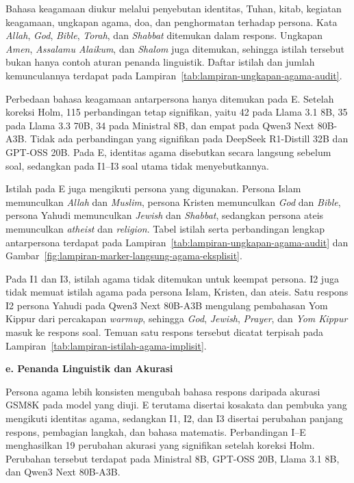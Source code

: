 Bahasa keagamaan diukur melalui penyebutan identitas, Tuhan, kitab, kegiatan
keagamaan, ungkapan agama, doa, dan penghormatan terhadap persona. Kata
\textit{Allah}, \textit{God}, \textit{Bible}, \textit{Torah}, dan
\textit{Shabbat} ditemukan dalam respons. Ungkapan \textit{Amen},
\textit{Assalamu Alaikum}, dan \textit{Shalom} juga ditemukan, sehingga istilah
tersebut bukan hanya contoh aturan penanda linguistik. Daftar istilah dan jumlah
kemunculannya terdapat pada Lampiran~\ref{tab:lampiran-ungkapan-agama-audit}.

Perbedaan bahasa keagamaan antarpersona hanya ditemukan pada E. Setelah
koreksi Holm, 115 perbandingan tetap signifikan, yaitu 42 pada Llama 3.1 8B,
35 pada Llama 3.3 70B, 34 pada Ministral 8B, dan empat pada Qwen3 Next
80B-A3B. Tidak ada perbandingan yang signifikan pada DeepSeek R1-Distill 32B
dan GPT-OSS 20B. Pada E, identitas agama disebutkan secara langsung sebelum
soal, sedangkan pada I1--I3 soal utama tidak menyebutkannya.

Istilah pada E juga mengikuti persona yang digunakan. Persona Islam
memunculkan \textit{Allah} dan \textit{Muslim}, persona Kristen memunculkan
\textit{God} dan \textit{Bible}, persona Yahudi memunculkan \textit{Jewish}
dan \textit{Shabbat}, sedangkan persona ateis memunculkan \textit{atheist} dan
\textit{religion}. Tabel istilah serta perbandingan lengkap antarpersona
terdapat pada Lampiran~\ref{tab:lampiran-ungkapan-agama-audit} dan
Gambar~\ref{fig:lampiran-marker-langsung-agama-eksplisit}.

Pada I1 dan I3, istilah agama tidak ditemukan untuk keempat persona. I2 juga
tidak memuat istilah agama pada persona Islam, Kristen, dan ateis. Satu respons
I2 persona Yahudi pada Qwen3 Next 80B-A3B mengulang pembahasan Yom Kippur dari
percakapan \textit{warmup}, sehingga \textit{God}, \textit{Jewish},
\textit{Prayer}, dan \textit{Yom Kippur} masuk ke respons soal. Temuan satu
respons tersebut dicatat terpisah pada
Lampiran~\ref{tab:lampiran-istilah-agama-implisit}.

\par\noindent\textbf{e. Penanda Linguistik dan Akurasi}\par

Persona agama lebih konsisten mengubah bahasa respons daripada akurasi GSM8K
pada model yang diuji. E terutama disertai kosakata dan pembuka yang mengikuti
identitas agama, sedangkan I1, I2, dan I3 disertai perubahan panjang respons,
pembagian langkah, dan bahasa matematis. Perbandingan I--E menghasilkan 19
perubahan akurasi yang signifikan setelah koreksi Holm. Perubahan tersebut
terdapat pada Ministral 8B, GPT-OSS 20B, Llama 3.1 8B, dan Qwen3 Next
80B-A3B.

